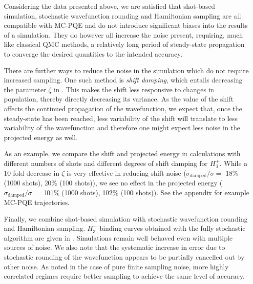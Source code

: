 \documentclass[%
 reprint,
 amsmath,amssymb,
 aps,
]{revtex4-2}
\begin{document}
{Considering the data presented above, we are satisfied that shot-based simulation, stochastic wavefunction rounding and Hamiltonian sampling are all compatible with MC-PQE and do not introduce significant biases into the results of a simulation. They do however all increase the noise present, requiring, much like classical QMC methods, a relatively long period of steady-state propagation to converge the desired quantities to the intended accuracy.

There are further ways to reduce the noise in the simulation which do not require increased sampling. One such method is \textit{shift damping},\cite{Booth2009} which entails decreasing the parameter $\zeta$ in . This makes the shift less responsive to changes in population, thereby directly decreasing its variance. As the value of the shift affects the continued propagation of the wavefunction, we expect that, once the steady-state has been reached, less variability of the shift will translate to less variability of the wavefunction and therefore one might expect less noise in the projected energy as well. 

As an example, we compare the shift and projected energy in calculations with different numbers of shots and different degrees of shift damping for $H_3^+$. While a 10-fold decrease in  $\zeta$ is very effective in reducing shift noise ($\sigma_\mathrm{damped}/\sigma =$ 18\% (1000 shots), 20\% (100 shots)), we see no effect in the projected energy ($\sigma_\mathrm{damped}/\sigma =$ 101\% (1000 shots), 102\% (100 shots)). See the appendix for example MC-PQE trajectories.

Finally, we combine shot-based simulation with stochastic wavefunction rounding and Hamiltonian sampling. $H_3^+$ binding curves obtained with the fully stochastic algorithm are given in . Simulations remain well behaved even with multiple sources of noise. We also note that the systematic increase in error due to stochastic rounding of the wavefunction appears to be partially cancelled out by other noise.  As  noted in the case of pure finite sampling noise, more highly correlated regimes require better sampling to achieve the same level of accuracy.

}
\end{document}
